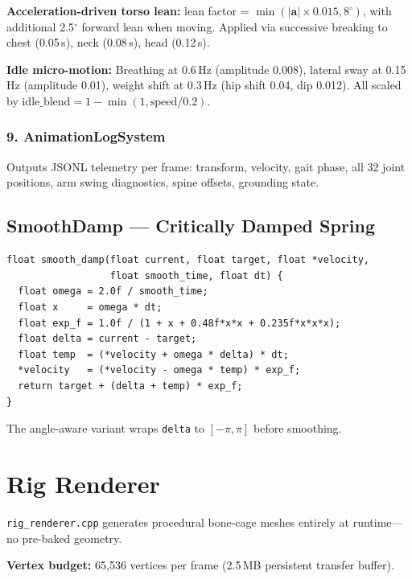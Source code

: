 \documentclass[11pt,a4paper]{article}
\begin{document}
\textbf{Acceleration-driven torso lean:} lean factor = $\min(|\mathbf{a}| \times 0.015, 8^\circ)$, with additional 2.5$^\circ$ forward lean when moving. Applied via successive breaking to chest (0.05\,s), neck (0.08\,s), head (0.12\,s).

\textbf{Idle micro-motion:} Breathing at 0.6\,Hz (amplitude 0.008), lateral sway at 0.15\,Hz (amplitude 0.01), weight shift at 0.3\,Hz (hip shift 0.04, dip 0.012). All scaled by $\text{idle\_blend} = 1 - \min(1, \text{speed}/0.2)$.

\subsubsection{9. AnimationLogSystem}

Outputs JSONL telemetry per frame: transform, velocity, gait phase, all 32 joint positions, arm swing diagnostics, spine offsets, grounding state.

\subsection{SmoothDamp --- Critically Damped Spring}
\label{sec:smoothdamp}

\begin{lstlisting}[caption={SmoothDamp implementation (Unity-compatible)}]
float smooth_damp(float current, float target, float *velocity,
                  float smooth_time, float dt) {
  float omega = 2.0f / smooth_time;
  float x     = omega * dt;
  float exp_f = 1.0f / (1 + x + 0.48f*x*x + 0.235f*x*x*x);
  float delta = current - target;
  float temp  = (*velocity + omega * delta) * dt;
  *velocity   = (*velocity - omega * temp) * exp_f;
  return target + (delta + temp) * exp_f;
}
\end{lstlisting}

The angle-aware variant wraps \texttt{delta} to $[-\pi, \pi]$ before smoothing.

\section{Rig Renderer}
\label{sec:rig-render}

\texttt{rig\_renderer.cpp} generates procedural bone-cage meshes entirely at runtime---no pre-baked geometry.

\textbf{Vertex budget:} 65{,}536 vertices per frame (2.5\,MB persistent transfer buffer).
\end{document}
